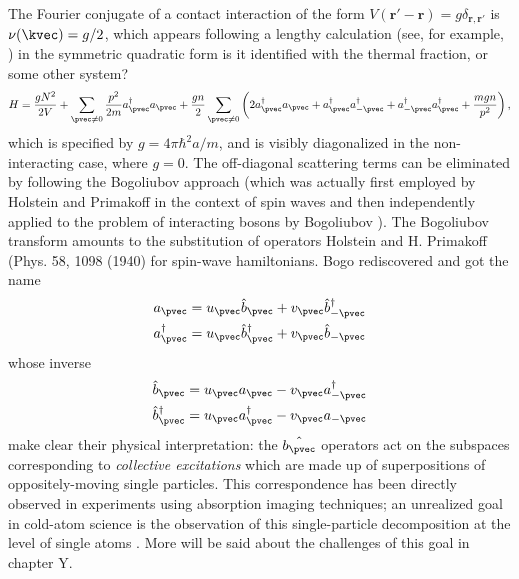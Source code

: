{{{{{{	The Fourier conjugate of a contact interaction of the form $V(\textbf{r}'-\textbf{r})=g\delta_{\textbf{r},\textbf{r}'}$ is $\nu(\kvec)=g/2$, which appears 	following a lengthy calculation (see, for example, \cite{PitaevskiiStringari}) in the symmetric quadratic form
	is it identified with the thermal fraction, or some other system?
	\begin{equation}
		H = \frac{gN^2}{2V} + \sum_{\pvec\neq0}\frac{p^2}{2m}a^\dagger_\pvec a_\pvec + \frac{gn}{2}\sum_{\pvec\neq0}\left(2a^\dagger_\pvec a_\pvec + a^\dagger_\pvec a^\dagger_{-\pvec} + a^\dagger_{-\pvec} a^\dagger_{\pvec} + \frac{mgn}{p^2}\right),
		\label{eqn:bog_H}
	\end{equation}
	which is specified by $g=4\pi\hbar^2a/m$, and is visibly diagonalized in the non-interacting case, where $g=0$.
	The off-diagonal scattering terms can be eliminated by following the Bogoliubov approach (which was actually first employed by Holstein and Primakoff in the context of spin waves \cite{schwabl} and then independently applied to the problem of interacting bosons by Bogoliubov \cite{bologiubov47}).
	The Bogoliubov transform amounts to the substitution of operators
	Holstein and H.
	Primakoff (Phys.
	58, 1098 (1940) for spin-wave hamiltonians.
	Bogo rediscovered and got the name
	\begin{align}
		a_\pvec &= u_\pvec \hat{b}_\pvec + v_\pvec \hat{b}^\dagger_{-\pvec}\\
		a_\pvec^\dagger &= u_\pvec\hat{b}_\pvec^\dagger + v_\pvec \hat{b}_{-\pvec}
		\label{bogotrans}
	\end{align}
	whose inverse
	\begin{align}
		\hat{b}_\pvec &= u_\pvec a_\pvec - v_\pvec a^\dagger_{-\pvec}\\
		\hat{b}_\pvec^\dagger &= u_\pvec a_\pvec^\dagger - v_\pvec a_{-\pvec}
		\label{bogoinverse}
	\end{align}
	make clear their physical interpretation: the $\hat{b_\pvec}$ operators act on the subspaces corresponding to \emph{collective excitations} which are made up of superpositions of oppositely-moving single particles.
	This correspondence has been directly observed in experiments \cite{vogels02} using absorption imaging techniques; an unrealized goal in cold-atom science is the observation of this single-particle decomposition at the level of single atoms .
	More will be said about the challenges of this goal in chapter Y.
	
}}}}}}
